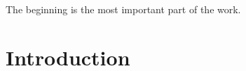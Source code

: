 



\begin{savequote}[50mm]
The beginning is the most important part of the work. 
\end{savequote}

\chapter{Introduction}
\label{cha:Introduction}

\ifpdf
    \graphicspath{{1_introduction/figures/PNG/}{1_introduction/figures/PDF/}{1_introduction/figures/}}
\else
    \graphicspath{{1_introduction/figures/EPS/}{1_introduction/figures/}}
\fi






